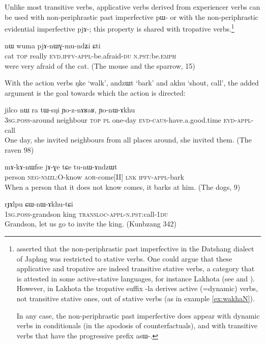 \documentclass[oldfontcommands,twoside,a4paper,12pt]{article}
\newcommand{\ipa}[1]{{\phon \mbox{#1}}} %
\newcommand{\appl}{\textsc{appl}}
\newcommand{\caus}{\textsc{caus}}
\newcommand{\du}{\textsc{du}}
\newcommand{\emphat}{\textsc{emph}}
\newcommand{\evd}{\textsc{evd}}
\newcommand{\ipf}{\textsc{ipfv}}
\newcommand{\npst}{\textsc{n.pst}}
\newcommand{\pl}{\textsc{pl}}
\newcommand{\poss}{\textsc{poss}}
\newcommand{\sg}{\textsc{sg}}
\newcommand{\topic}{\textsc{top}}
\newcommand{\transloc}{\textsc{transloc}}
\begin{document}
 


 Unlike most transitive verbs, applicative verbs derived from experiencer verbs can be used with non-periphrastic past imperfective \ipa{pɯ-} or with the non-periphrastic evidential imperfective \ipa{pjɤ-}; this property is shared with tropative verbs.\footnote{ \citet[64]{lin11direction} asserted that the  non-periphrastic past imperfective  in the Datshang dialect of Japhug was restricted to stative verbs. One could argue that these applicative and tropative are indeed transitive stative verbs, a category that is attested in some active-stative languages, for instance Lakhota (see \citealt[77]{deloria41} and \citealt[707]{ullrich08}). However, in Lakhota the tropative suffix \ipa{-la} derives active (=dynamic) verbs, not transitive stative ones, out of stative verbs (as in  example \ref{ex:wakhaN}).   
 
In any case, the   non-periphrastic past imperfective does appear  with   dynamic verbs in conditionals (in the apodosis of counterfactuals), and with transitive verbs that have the progressive prefix \ipa{asɯ-}.   }
 
   \begin{exe}
   \ex 
\gll \ipa{lɯlu} 	\ipa{nɯ} 	\ipa{wuma} 	\ipa{pjɤ-nɯɣ-mu-ndʑi} 	\ipa{ɕti}   \\
cat \topic{} really \evd{}.\ipf{}-\appl{}-be.afraid-\du{} \npst{}:be.\emphat{} \\
  were very afraid of the cat. (The mouse and the sparrow, 15)
   \end{exe} 
 
  
 With the action verbs \ipa{ŋke} `walk', \ipa{andzɯt}  `bark' and \ipa{akhu} `shout, call', the added argument is the goal towards which the action is directed:
 
   \begin{exe}
   \ex 
\gll \ipa{ɯ-rkɤrkɯ} \ipa{jilco} 	\ipa{nɯ} 	\ipa{ra} 	\ipa{tɯ-sŋi} 	\ipa{ɲo-z-nɤʁaʁ,} 	\ipa{ɲo-nɯ-ɤkhu}  \\
 3\sg{}.\poss{}-around neighbour \topic{} \pl{} one-day \evd{}-\caus{}-have.a.good.time \evd{}-\appl{}-call \\
 \glt    One day, she invited  neighbours from all places around, she invited them. (The raven 98)
   \end{exe} 
   
     \begin{exe}
   \ex 
\gll   \ipa{tɯrme}  	\ipa{mɤ-kɤ-nɯfse}  	\ipa{jɤ-ɣe}  	\ipa{tɕe}  	\ipa{tu-nɯ-ɤndzɯt}  \\
person \textsc{neg-nmzl:O}-know \textsc{aor}-come[II] \textsc{lnk} \textsc{ipfv-appl}-bark \\
  \glt  When a person that it does not know comes, it barks at him.  (The dogs, 9)
   \end{exe}  
   \begin{exe}
   \ex 
\gll \ipa{a-ɣe} 	\ipa{rɟɤlpu} 	\ipa{ɕɯ-nɯ-ɤkhu-tɕi} \\
  1\sg{}.\poss{}-grandson king \transloc{}-\appl{}-\npst{}:call-1\du{} \\
 \glt    Grandson, let us go to invite the king. (Kunbzang 342)
   \end{exe} 
  
\end{document}
